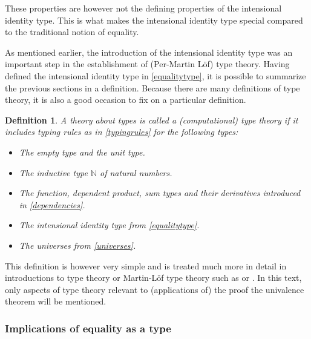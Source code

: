 \documentclass[11pt,a4paper,twoside,xetex,draft]{book}
\newcommand{\keyword}[1]{\emph{#1}\index{#1}}
\newtheorem{definition}[theorem]{Definition}
\begin{document}
These properties are however not the defining properties of the intensional identity type. This is what makes the intensional identity type special compared to the traditional notion of equality.


As mentioned earlier, the introduction of the intensional identity type was an important step in the establishment of (Per-Martin L\"of) type theory. Having defined the intensional identity type in \cref{equalitytype}, it is possible to summarize the previous sections in a definition. Because there are many definitions of type theory, it is also a good occasion to fix on a particular definition.

\begin{definition}\label{typetheory}
  A theory about types is called a (computational) \keyword{type theory} if it includes typing rules as in \cref{typingrules} for the following types:
  \begin{itemize}
   \item The empty type and the unit type.
   \item The inductive type $\mathbb{N}$ of natural numbers.
   \item The function, dependent product, sum types and their derivatives introduced in \cref{dependencies}.
   \item The intensional identity type from \cref{equalitytype}.
   \item The universes from \cref{universes}.
  \end{itemize}
\end{definition}

This definition is however very simple and is treated much more in detail in introductions to type theory or Martin-L\"of type theory such as \cite{Palmgren2014} or \cite{Voevodsky2013}. In this text, only aspects of type theory relevant to (applications of) the proof the univalence theorem will be mentioned.

\subsubsection{Implications of equality as a type}
\end{document}
